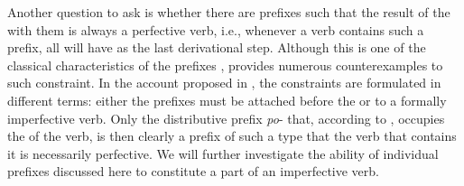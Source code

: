 Another question to ask is whether there are prefixes such that the result of the  with them is always a perfective verb, i.e., whenever a verb contains such a prefix, all  will have  as the last derivational step. Although this is one of the classical characteristics of the  prefixes \citep[see, e.g.][]{Ramchand:04, Svenonius:04a, Romanova:06}, \citet{Tatevosov:07, Tatevosov:09} provides numerous counterexamples to such constraint. In the account proposed in \citealt{Tatevosov:09}, the constraints are formulated in different terms: either the prefixes must be attached before the  or to a formally imperfective verb. Only the distributive prefix \textit{po}- that, according to \citet{Tatevosov:09}, occupies the  of the verb, is then clearly a prefix of such a type that the verb that contains it is necessarily perfective. We will further investigate the ability of individual prefixes discussed here to constitute a part of an imperfective verb.

